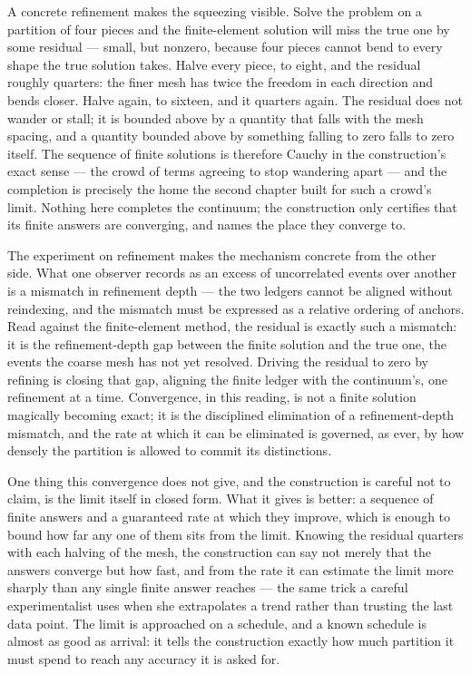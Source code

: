 A concrete refinement makes the squeezing visible. Solve the problem on a partition of four pieces and
the finite-element solution will miss the true one by some residual --- small, but nonzero, because four
pieces cannot bend to every shape the true solution takes. Halve every piece, to eight, and the residual
roughly quarters: the finer mesh has twice the freedom in each direction and bends closer. Halve again,
to sixteen, and it quarters again. The residual does not wander or stall; it is bounded above by a
quantity that falls with the mesh spacing, and a quantity bounded above by something falling to zero
falls to zero itself. The sequence of finite solutions is therefore Cauchy in the construction's exact
sense --- the crowd of terms agreeing to stop wandering apart --- and the completion is precisely the
home the second chapter built for such a crowd's limit. Nothing here completes the continuum; the
construction only certifies that its finite answers are converging, and names the place they converge
to.

The experiment on refinement makes the mechanism concrete from the other side. What one observer
records as an excess of uncorrelated events over another is a mismatch in refinement depth --- the two
ledgers cannot be aligned without reindexing, and the mismatch must be expressed as a relative ordering
of anchors. Read against the finite-element method, the residual is exactly such a mismatch: it is the
refinement-depth gap between the finite solution and the true one, the events the coarse mesh has not
yet resolved. Driving the residual to zero by refining is closing that gap, aligning the finite
ledger with the continuum's, one refinement at a time. Convergence, in this reading, is not a finite
solution magically becoming exact; it is the disciplined elimination of a refinement-depth mismatch,
and the rate at which it can be eliminated is governed, as ever, by how densely the partition is
allowed to commit its distinctions.

One thing this convergence does not give, and the construction is careful not to claim, is the limit
itself in closed form. What it gives is better: a sequence of finite answers and a guaranteed rate at
which they improve, which is enough to bound how far any one of them sits from the limit. Knowing the
residual quarters with each halving of the mesh, the construction can say not merely that the answers
converge but how fast, and from the rate it can estimate the limit more sharply than any single finite
answer reaches --- the same trick a careful experimentalist uses when she extrapolates a trend rather
than trusting the last data point. The limit is approached on a schedule, and a known schedule is almost
as good as arrival: it tells the construction exactly how much partition it must spend to reach any
accuracy it is asked for.


